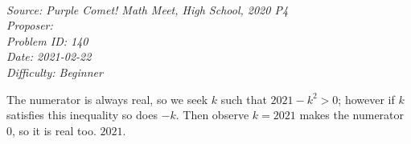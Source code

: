 \SSbreak\\
\emph{Source: Purple Comet! Math Meet, High School, 2020 P4}\\
\emph{Proposer: \Pnjoy}\\ %
\emph{Problem ID: 140}\\
\emph{Date: 2021-02-22}\\
\emph{Difficulty: Beginner}\\
\SSbreak

\bigskip

\begin{solution}\hfil\medskip
	
	The numerator is always real, so we seek $k$ such that $2021 - k^2 > 0$; however if $k$ satisfies this inequality so does $-k$. Then observe
	$k = 2021$ makes the numerator 0, so it is real too. $\boxed{2021}$.
\end{solution}\bigskip
